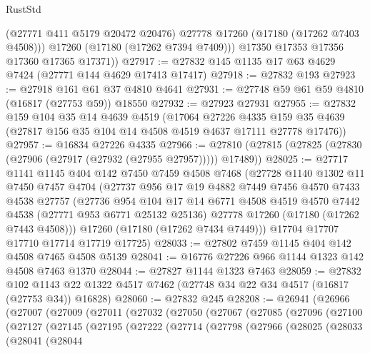 \begin{lexlean}{RustStd}
\begin{coremodule}
            (@27771 @411 @5179 @20472 @20476)
            @27778
            @17260
            (@17180 (@17262 @7403 @4508)))
          @17260
          (@17180 (@17262 @7394 @7409)))
        @17350
        @17353
        @17356
        @17360
        @17365
        @17371))
@27917 := @27832 @145 @1135 @17 @63 @4629 @7424 (@27771 @144 @4629 @17413 @17417)
@27918 := @27832 @193
@27923 := @27918 @161 @61 @37 @4810 @4641
@27931 := @27748 @59 @61 @59 @4810 (@16817 (@27753 @59)) @18550
@27932 := @27923 @27931
@27955 := @27832
    @159
    @104
    @35
    @14
    @4639
    @4519
    (@17064
      @27226
      @4335
      @159
      @35
      @4639
      (@27817 @156 @35 @104 @14 @4508 @4519 @4637 @17111 @27778 @17476))
@27957 := @16834 @27226 @4335
@27966 := @27810 (@27815 (@27825 (@27830 (@27906 (@27917 (@27932 (@27955 @27957))))) @17489))
@28025 := @27717
    @1141
    @1145
    @404
    @142
    @7450
    @7459
    @4508
    @7468
    (@27728
      @1140
      @1302
      @11
      @7450
      @7457
      @4704
      (@27737
        @956
        @17
        @19
        @4882
        @7449
        @7456
        @4570
        @7433
        @4538
        @27757
        (@27736
          @954
          @104
          @17
          @14
          @6771
          @4508
          @4519
          @4570
          @7442
          @4538
          (@27771 @953 @6771 @25132 @25136)
          @27778
          @17260
          (@17180 (@17262 @7443 @4508)))
        @17260
        (@17180 (@17262 @7434 @7449)))
      @17704
      @17707
      @17710
      @17714
      @17719
      @17725)
@28033 := @27802 @7459 @1145 @404 @142 @4508 @7465 @4508 @5139
@28041 := @16776 @27226 @966 @1144 @1323 @142 @4508 @7463 @1370
@28044 := @27827 @1144 @1323 @7463
@28059 := @27832
    @102
    @1143
    @22
    @1322
    @4517
    @7462
    (@27748 @34 @22 @34 @4517 (@16817 (@27753 @34)) @16828)
@28060 := @27832 @245
@28208 := @26941
    (@26966
      (@27007
        (@27009
          (@27011
            (@27032
              (@27050
                (@27067
                  (@27085
                    (@27096
                      (@27100
                        (@27127
                          (@27145
                            (@27195
                              (@27222
                                (@27714
                                  (@27798
                                    (@27966
                                      (@28025
                                        (@28033
                                          (@28041
                                            (@28044

\end{coremodule}
\end{lexlean}

